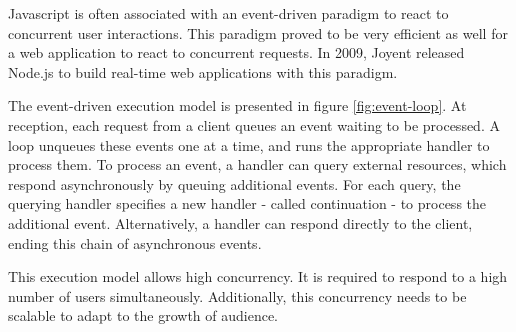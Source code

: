 Javascript is often associated with an event-driven paradigm to react to concurrent user interactions.
This paradigm proved to be very efficient as well for a web application to react to concurrent requests.
In 2009, Joyent released Node.js to build real-time web applications with this paradigm.

\begin{figure}[h!]
\end{figure}

The event-driven execution model is presented in figure \ref{fig:event-loop}.
At reception, each request from a client queues an event waiting to be processed.
A loop unqueues these events one at a time, and runs the appropriate handler to process them.
To process an event, a handler can query external resources, which respond asynchronously by queuing additional events.
For each query, the querying handler specifies a new handler - called continuation - to process the additional event.
Alternatively, a handler can respond directly to the client, ending this chain of asynchronous events.


This execution model allows high concurrency.
It is required to respond to a high number of users simultaneously.
Additionally, this concurrency needs to be scalable to adapt to the growth of audience. %

